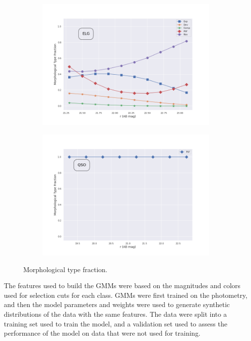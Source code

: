 \begin{figure}
\begin{subfigure}{.5\textwidth}
\caption{}
\end{subfigure}
\hfill
\begin{subfigure}{.5\textwidth}
\centering
\includegraphics[width=1\linewidth]{images/gmm/elg_morph.png}
\caption{}
\end{subfigure}
\begin{subfigure}{.5\textwidth}
\centering
\includegraphics[width=1\linewidth]{images/gmm/qso_morph.png}
\caption{}
\end{subfigure}
\label{fig:morphfrac}
\caption{Morphological type fraction.}
\end{figure}

The features used to build the GMMs were based on the magnitudes and colors used for selection cuts for each class. GMMs were first trained on the photometry, and then the model parameters and weights were used to generate synthetic distributions of the data with the same features. The data were split into a training set used to train the model, and a validation set used to assess the performance of the model on data that were not used for training. 

